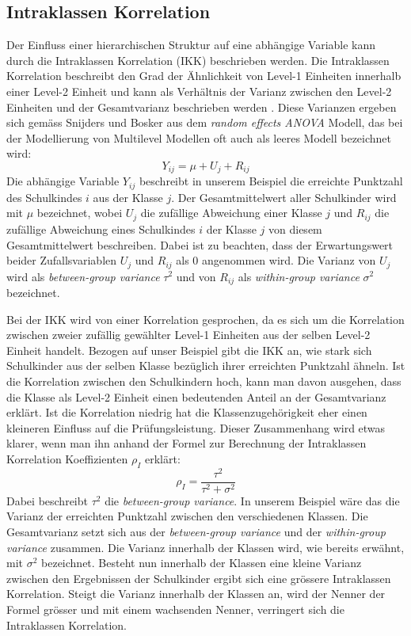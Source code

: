 \documentclass[12pt]{article}\usepackage[]{graphicx}\usepackage[]{color}
\numberwithin{equation}{section}
\begin{document}
\subsection{Intraklassen Korrelation} \label{section:icc}
Der Einfluss einer hierarchischen Struktur auf eine abhängige Variable kann durch die Intraklassen Korrelation (IKK) beschrieben werden. Die Intraklassen Korrelation beschreibt den Grad der Ähnlichkeit von Level-1 Einheiten innerhalb einer Level-2 Einheit und kann als Verhältnis der Varianz zwischen den Level-2 Einheiten und der Gesamtvarianz beschrieben werden \citep{FieldAndy2013DsuR, SnijdersTomA.B2012Ma:a, twisk_2006}. Diese Varianzen ergeben sich gemäss Snijders und Bosker \citeyearpar{SnijdersTomA.B2012Ma:a} aus dem \textit{random effects ANOVA} Modell, das bei der Modellierung von Multilevel Modellen oft auch als leeres Modell bezeichnet wird:
\begin{equation} \label{eq:empty_model}
Y_{ij} = \mu + U_{j} + R_{ij}
\end{equation}
Die abhängige Variable $Y_{ij}$ beschreibt in unserem Beispiel die erreichte Punktzahl des Schulkindes $i$ aus der Klasse $j$. Der Gesamtmittelwert aller Schulkinder wird mit $\mu$ bezeichnet, wobei $U_{j}$ die zufällige Abweichung einer Klasse $j$ und $R_{ij}$ die zufällige Abweichung eines Schulkindes $i$ der Klasse $j$ von diesem Gesamtmittelwert beschreiben. Dabei ist zu beachten, dass der Erwartungswert beider Zufallsvariablen $U_{j}$ und $R_{ij}$ als 0 angenommen wird. Die Varianz von $U_{j}$ wird als \textit{between-group variance} $\tau^2$ und von $R_{ij}$ als \textit{within-group variance} $\sigma^2$ bezeichnet.

Bei der IKK wird von einer Korrelation gesprochen, da es sich um die Korrelation zwischen zweier zufällig gewählter Level-1 Einheiten aus der selben Level-2 Einheit handelt. Bezogen auf unser Beispiel gibt die IKK an, wie stark sich Schulkinder aus der selben Klasse bezüglich ihrer erreichten Punktzahl ähneln. Ist die Korrelation zwischen den Schulkindern hoch, kann man davon ausgehen, dass die Klasse als Level-2 Einheit einen bedeutenden Anteil an der Gesamtvarianz erklärt. Ist die Korrelation niedrig hat die Klassenzugehörigkeit eher einen kleineren Einfluss auf die Prüfungsleistung. Dieser Zusammenhang wird etwas klarer, wenn man ihn anhand der Formel zur Berechnung der Intraklassen Korrelation Koeffizienten $\rho_{I}$ erklärt:
\begin{equation} \label{eq:icc}
\rho_{I} = \dfrac{\tau^{2}}{\tau^{2} + \sigma^{2}}
\end{equation} 
Dabei beschreibt $\tau^2$ die \textit{between-group variance}. In unserem Beispiel wäre das die Varianz der erreichten Punktzahl zwischen den verschiedenen Klassen. Die Gesamtvarianz setzt sich aus der \textit{between-group variance} und der \textit{within-group variance} zusammen. Die Varianz innerhalb der Klassen wird, wie bereits erwähnt, mit $\sigma^2$ bezeichnet. Besteht nun innerhalb der Klassen eine kleine Varianz zwischen den Ergebnissen der Schulkinder ergibt sich eine grössere Intraklassen Korrelation. Steigt die Varianz innerhalb der Klassen an, wird der Nenner der Formel grösser und mit einem wachsenden Nenner, verringert sich die Intraklassen Korrelation.
\end{document}
